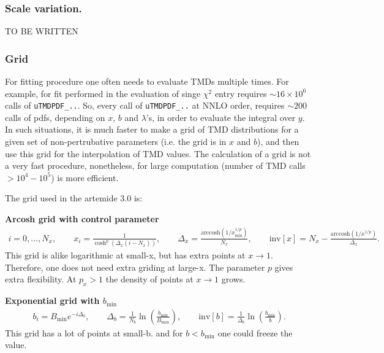 \documentclass[prd,nofootinbib,eqsecnum,final]{revtex4}
\renewcommand{\(}{\left(}
\renewcommand{\)}{\right)}
\renewcommand{\[}{\left[}
\renewcommand{\]}{\right]}
\begin{document}
\subsubsection{Scale variation.} 

TO BE WRITTEN

\subsubsection{Grid}
\label{sec:OPE:grid1}

For fitting procedure one often needs to evaluate TMDs multiple times. For example, for fit performed in \cite{Scimemi:2017etj} the evaluation of singe $\chi^2$ entry requires $\sim 16\times 10^6$ calls of \texttt{uTMDPDF{\_}..}. So, every call of \texttt{uTMDPDF{\_}..} at NNLO order, requires $\sim 200$ calls of pdfs, depending on $x$, $b$ and $\lambda$'s, in order to evaluate the integral over $y$. In such situations, it is much faster to make a grid of TMD distributions for a given set of non-pertrubative parameters (i.e. the grid is in $x$ and $b$), and then use this grid for the interpolation of TMD values. The calculation of a grid is not a very fast procedure, nonetheless, for large computation (number of TMD calls $>10^4-10^5$) is more efficient.

The grid used in the artemide 3.0 is:

\textbf{Arcosh grid with control parameter}
\begin{eqnarray}\label{OPE:x-grid}
i=0,...,N_x,\qquad 
x_i=\frac{1}{\cosh^p\(\Delta_x(i-N_x)\)},\qquad \Delta_x=\frac{\text{arccosh}(1/x^{1/p}_{\text{min}})}{N_x},\qquad \text{inv}[x]=
N_x-\frac{\text{arccosh}(1/x^{1/p})}{\Delta_x}.
\end{eqnarray}
This grid is alike logarithmic at small-x, but has extra points at $x\to 1$. Therefore, one does not need extra griding at large-x. The parameter $p$ gives extra flexibility. At $p_x>1$ the density of points at $x\to 1$ grows. 

\textbf{Exponential grid with $b_{\text{min}}$} 
\begin{eqnarray}\label{OPE:b-grid}
b_i=B_{\text{min}} e^{-i \Delta_b},\qquad \Delta_b=\frac{1}{N_b}\ln\(\frac{b_{\text{min}}}{B_{\text{max}}}\),\qquad \text{inv}[b]=\frac{1}{\Delta_b}\ln\(\frac{b_{\text{min}}}{b}\).
\end{eqnarray}
This grid has a lot of points at small-b. and for $b<b_\text{min}$ one could freeze the value.
\end{document}
